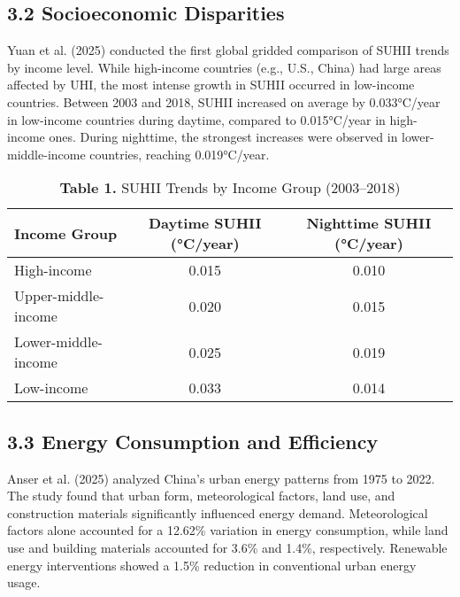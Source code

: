 \documentclass[draft]{agujournal}
\begin{document}
\subsection*{3.2 Socioeconomic Disparities}

Yuan et al. (2025) conducted the first global gridded comparison of SUHII trends by income level. While high-income countries (e.g., U.S., China) had large areas affected by UHI, the most intense growth in SUHII occurred in low-income countries. Between 2003 and 2018, SUHII increased on average by 0.033°C/year in low-income countries during daytime, compared to 0.015°C/year in high-income ones. During nighttime, the strongest increases were observed in lower-middle-income countries, reaching 0.019°C/year.

\begin{table}[h]
\centering
\caption{\textbf{Table 1.} SUHII Trends by Income Group (2003--2018)}
\begin{tabular}{@{}lcc@{}}
\toprule
\textbf{Income Group} & \textbf{Daytime SUHII (°C/year)} & \textbf{Nighttime SUHII (°C/year)} \\
\midrule
High-income            & 0.015                          & 0.010                             \\
Upper-middle-income    & 0.020                          & 0.015                             \\
Lower-middle-income    & 0.025                          & 0.019                             \\
Low-income             & 0.033                          & 0.014                             \\
\bottomrule
\end{tabular}
\label{tab:suhii_trends}
\end{table}

\subsection*{3.3 Energy Consumption and Efficiency}

Anser et al. (2025) analyzed China’s urban energy patterns from 1975 to 2022. The study found that urban form, meteorological factors, land use, and construction materials significantly influenced energy demand. Meteorological factors alone accounted for a 12.62\% variation in energy consumption, while land use and building materials accounted for 3.6\% and 1.4\%, respectively. Renewable energy interventions showed a 1.5\% reduction in conventional urban energy usage.
\end{document}
